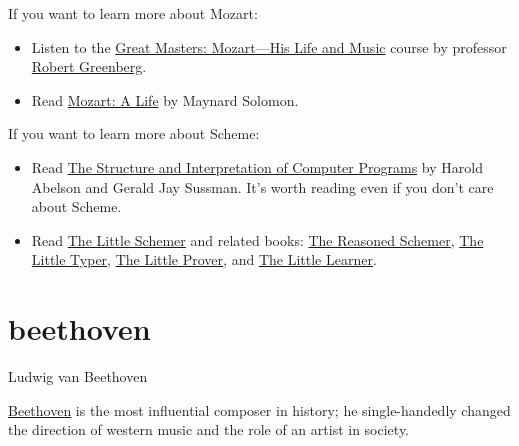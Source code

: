 \documentclass{article}
\begin{document}
If you want to learn more about Mozart:
\begin{itemize}
    \item
    Listen to the \href{https://www.thegreatcourses.com/courses/great-masters-mozart-his-life-and-music}{Great Masters: Mozart---His Life and Music} course by professor \href{https://robertgreenbergmusic.com/}{Robert Greenberg}.
    \item
    Read \href{https://www.amazon.com/Mozart-Life-Maynard-Solomon/dp/0060883448}{Mozart: A Life} by Maynard Solomon.
\end{itemize}

If you want to learn more about Scheme:
\begin{itemize}
    \item
    Read \href{https://mitpress.mit.edu/9780262510875/structure-and-interpretation-of-computer-programs/}{The Structure and Interpretation of Computer Programs} by Harold Abelson and Gerald Jay Sussman.
    It's worth reading even if you don't care about Scheme.
    \item
    Read \href{https://www.amazon.com/Little-Schemer-Daniel-P-Friedman/dp/0262560992/}{The Little Schemer} and related books: \href{https://www.amazon.com/Reasoned-Schemer-MIT-Press/dp/0262535513/}{The Reasoned Schemer}, \href{https://www.amazon.com/Little-Typer-MIT-Press/dp/0262536439/}{The Little Typer}, \href{https://www.amazon.com/Little-Prover-MIT-Press/dp/0262527952/}{The Little Prover}, and \href{https://www.amazon.com/Little-Learner-Straight-Line-Learning/dp/026254637X/}{The Little Learner}.
\end{itemize}

\section{beethoven}{Ludwig van Beethoven}

\href{https://en.wikipedia.org/wiki/Ludwig_van_Beethoven}{Beethoven} is the most influential composer in history;
he single-handedly changed the direction of western music and the role of an artist in society.
\end{document}
